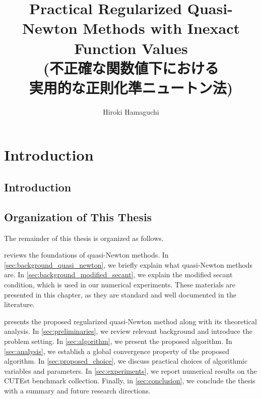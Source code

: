 \documentclass[uplatex,english,suri,master,dvipdfmx]{suribt}
\title{Practical Regularized Quasi-Newton Methods with Inexact Function Values\\
(不正確な関数値下における\\実用的な正則化準ニュートン法)}
\author{Hiroki Hamaguchi}
\begin{document}
\maketitle%

\frontmatter%
\begin{abstract}%
  
\end{abstract}

\tableofcontents%

\mainmatter%

\chapter{Introduction}

\section{Introduction}\label{sec:introduction}



\section{Organization of This Thesis}

The remainder of this thesis is organized as follows.

 reviews the foundations of quasi-Newton methods.
In \cref{sec:background_quasi_newton}, we briefly explain what quasi-Newton methods are.
In \cref{sec:background_modified_secant}, we explain the modified secant condition, which is used in our numerical experiments.
These materials are presented in this chapter, as they are standard and well documented in the literature.

 presents the proposed regularized quasi-Newton method along with its theoretical analysis.
In \cref{sec:preliminaries}, we review relevant background and introduce the problem setting.
In \cref{sec:algorithm}, we present the proposed algorithm.
In \cref{sec:analysis}, we establish a global convergence property of the proposed algorithm.
In \cref{sec:proposed_choice}, we discuss practical choices of algorithmic variables and parameters.
In \cref{sec:experiments}, we report numerical results on the CUTEst benchmark collection.
Finally, in \cref{sec:conclusion}, we conclude the thesis with a summary and future research directions.
\end{document}
